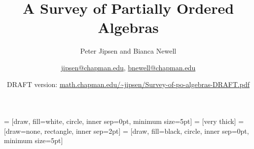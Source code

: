\documentclass[openany,twocolumn]{amsbook}
\title{A Survey of Partially Ordered Algebras}
\author{Peter Jipsen and Bianca Newell}
\author{\url{jipsen@chapman.edu}, \url{bnewell@chapman.edu}}
\author{DRAFT version: \url{math.chapman.edu/~jipsen/Survey-of-po-algebras-DRAFT.pdf}}
\begin{document}
 = [draw, fill=white, circle, inner sep=0pt, minimum size=5pt]
 = [very thick]
 = [draw=none, rectangle, inner sep=2pt] %
 = [draw, fill=black, circle, inner sep=0pt, minimum size=5pt] %
\onecolumn
\maketitle

\hypertarget{tocontents}{}
\tableofcontents





\hypertarget{toindex}{}
\printindex
\end{document}
